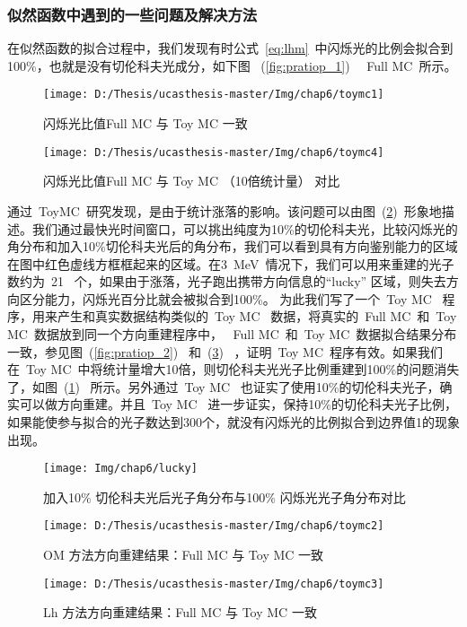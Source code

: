 \subsubsection{似然函数中遇到的一些问题及解决方法}
在似然函数的拟合过程中，我们发现有时公式~\ref{eq:lhm}~中闪烁光的比例会拟合到100\%，也就是没有切伦科夫光成分，如下图
~(\ref{fig:pratiop_1})~ ~Full MC~所示。
\begin{figure}[!htbp]
\begin{minipage}[t]{0.48\linewidth}
  \centering
     \texttt{[image: D:/Thesis/ucasthesis-master/Img/chap6/toymc1]}
    \caption{ 闪烁光比值Full MC 与 Toy MC 一致}
    \label{fig:pratiop_1}
  \end{minipage}%
\quad\quad
  \begin{minipage}[t]{0.48\linewidth}
  \centering
    \texttt{[image: D:/Thesis/ucasthesis-master/Img/chap6/toymc4]}
    \caption{ 闪烁光比值Full MC 与 Toy MC （10倍统计量） 对比 }
    \label{fig:pratiop_4}
  \end{minipage}
  \end{figure}
通过~ToyMC~研究发现，是由于统计涨落的影响。该问题可以由图~(\ref{fig:lucky})~形象地描述。我们通过最快光时间窗口，可以挑出纯度为10\%的切伦科夫光，比较闪烁光的角分布和加入10\%切伦科夫光后的角分布，我们可以看到具有方向鉴别能力的区域在图中红色虚线方框框起来的区域。在3~MeV~情况下，我们可以用来重建的光子数约为~21~ 个，如果由于涨落，光子跑出携带方向信息的``lucky'' 区域，则失去方向区分能力，闪烁光百分比就会被拟合到100\%。 为此我们写了一个~Toy MC~ 程序，用来产生和真实数据结构类似的~Toy MC~ 数据，将真实的~Full MC~和~Toy MC~数据放到同一个方向重建程序中，
~Full MC~和~Toy MC~数据拟合结果分布一致，参见图~(\ref{fig:pratiop_2}) ~和~(\ref{fig:pratiop_3}) ~，证明~Toy MC~程序有效。如果我们在~Toy MC~中将统计量增大10倍，则切伦科夫光光子比例重建到100\%的问题消失了，如图~(\ref{fig:pratiop_4}) ~所示。另外通过~Toy MC~ 也证实了使用10\%的切伦科夫光子，确实可以做方向重建。并且~Toy MC~ 进一步证实，保持10\%的切伦科夫光子比例，如果能使参与拟合的光子数达到300个，就没有闪烁光的比例拟合到边界值1的现象出现。\\
\begin{figure}[!htbp]
  \centering
   \texttt{[image: Img/chap6/lucky]}
    \caption{加入10\% 切伦科夫光后光子角分布与100\% 闪烁光光子角分布对比}
  \label{fig:lucky}
\end{figure}
\begin{figure}[!htbp]
\begin{minipage}[t]{0.48\linewidth}
  \centering
     \texttt{[image: D:/Thesis/ucasthesis-master/Img/chap6/toymc2]}
    \caption{ OM 方法方向重建结果：Full MC 与 Toy MC 一致}
    \label{fig:pratiop_2}
  \end{minipage}%
  \quad\quad
  \begin{minipage}[t]{0.48\linewidth}
  \centering
    \texttt{[image: D:/Thesis/ucasthesis-master/Img/chap6/toymc3]}
    \caption{ Lh 方法方向重建结果：Full MC 与 Toy MC 一致 }
    \label{fig:pratiop_3}
  \end{minipage}
  \end{figure}
